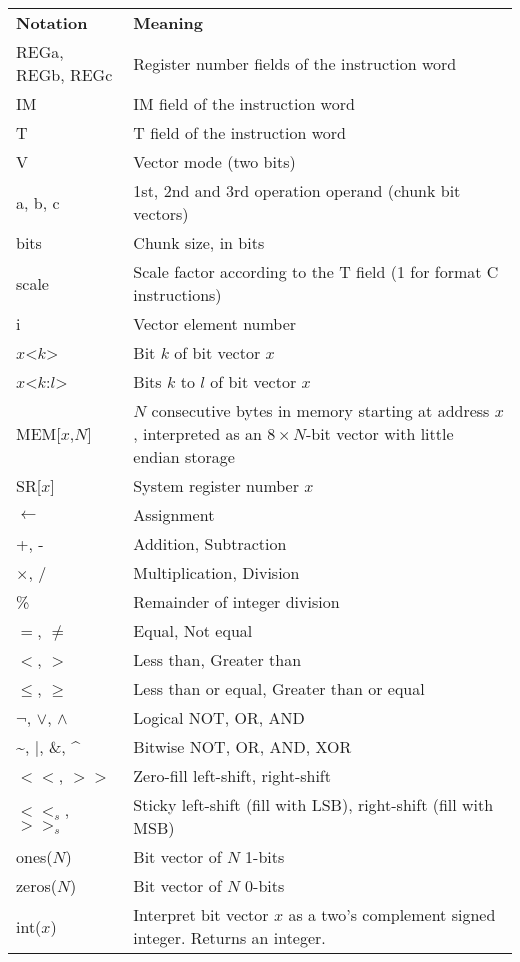\begin{tabular}{lp{340pt}}
\textbf{Notation} & \textbf{Meaning} \\
REGa, REGb, REGc & Register number fields of the instruction word \\
IM & IM field of the instruction word \\
T & T field of the instruction word \\
V & Vector mode (two bits) \\
a, b, c & 1st, 2nd and 3rd operation operand (chunk bit vectors) \\
bits & Chunk size, in bits \\
scale & Scale factor according to the T field (1 for format C instructions) \\
i & Vector element number \\
$x$<$k$> & Bit $k$ of bit vector $x$ \\
$x$<$k$:$l$> & Bits $k$ to $l$ of bit vector $x$ \\
MEM[$x$,$N$] & $N$ consecutive bytes in memory starting at address $x$,
               interpreted as an $8\times N$-bit vector with little endian
               storage \\
SR[$x$] & System register number $x$ \\
$\leftarrow$ & Assignment \\
+, - & Addition, Subtraction \\
$\times$, / & Multiplication, Division \\
\% & Remainder of integer division \\
$=$, $\neq$ & Equal, Not equal \\
$<$, $>$ & Less than, Greater than \\
$\leq$, $\geq$ & Less than or equal, Greater than or equal \\
$\neg$, $\vee$, $\wedge$ & Logical NOT, OR, AND \\
\textasciitilde, $|$, \&, \textasciicircum & Bitwise NOT, OR, AND, XOR \\
$<<$, $>>$ & Zero-fill left-shift, right-shift \\
$<<_{s}$, $>>_{s}$ & Sticky left-shift (fill with LSB), right-shift (fill with MSB) \\
ones($N$) & Bit vector of $N$ 1-bits \\
zeros($N$) & Bit vector of $N$ 0-bits \\
int($x$) & Interpret bit vector $x$ as a two's complement signed integer.
           Returns an integer. \\

\end{tabular}
